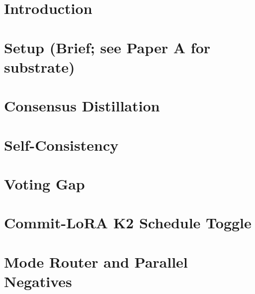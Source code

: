 \documentclass[11pt]{article}
\begin{document}
\section{Introduction}


\section{Setup (Brief; see Paper A for substrate)}


\section{Consensus Distillation}
\label{sec:consensus}


\section{Self-Consistency}
\label{sec:self-consistency}


\section{Voting Gap}
\label{sec:voting-gap}


\section{Commit-LoRA K2 Schedule Toggle}
\label{sec:k2}


\section{Mode Router and Parallel Negatives}
\label{sec:mode-router}


\end{document}
